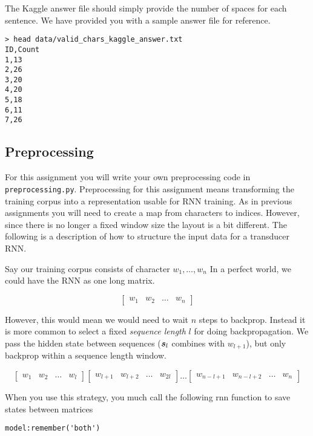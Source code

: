 \documentclass[11pt]{article}
\begin{document}
The Kaggle answer file should simply provide the number of spaces for each sentence. 
We have provided you with a sample answer file for reference.     

\begin{lstlisting}
> head data/valid_chars_kaggle_answer.txt 
ID,Count
1,13
2,26
3,20
4,20
5,18
6,11
7,26
\end{lstlisting}

\subsection{Preprocessing}

For this assignment you will write your own preprocessing code
in \texttt{preprocessing.py}. Preprocessing for this assignment
means transforming the training corpus into a representation 
usable for RNN training. As in previous assignments you 
will need to create a map from characters 
to indices. However, since there is no longer a fixed window size the layout is 
a bit different. The following is a description of how to structure the 
input data for a transducer RNN.

Say our training corpus consists of character $w_1, \ldots, w_n$ 
In a perfect world, we could have the RNN as one long matrix. 

\[
  \begin{bmatrix}
    w_1 & w_2 & \ldots & w_n
  \end{bmatrix}
\] 

However, this would mean we would need to wait $n$ steps to backprop. Instead 
it is more common to select a fixed \textit{sequence length} $l$ for doing 
backpropagation. We pass the hidden state  between sequences ($\boldsymbol{s}_l$ combines with $w_{l+1}$), but only 
backprop within a sequence length window. 

\[
  \begin{bmatrix}
    w_1 & w_2 & \ldots & w_{l}
  \end{bmatrix}   \begin{bmatrix}
    w_{l+1} & w_{l+2} & \ldots & w_{2l}
  \end{bmatrix}
  \ldots
  \begin{bmatrix}
    w_{n-l+1} & w_{n-l+2} & \ldots & w_{n}
  \end{bmatrix}
\] 

When you use this strategy, you much call the following rnn function to save states between 
matrices 

\begin{lstlisting}
model:remember('both')
\end{lstlisting}
\end{document}

